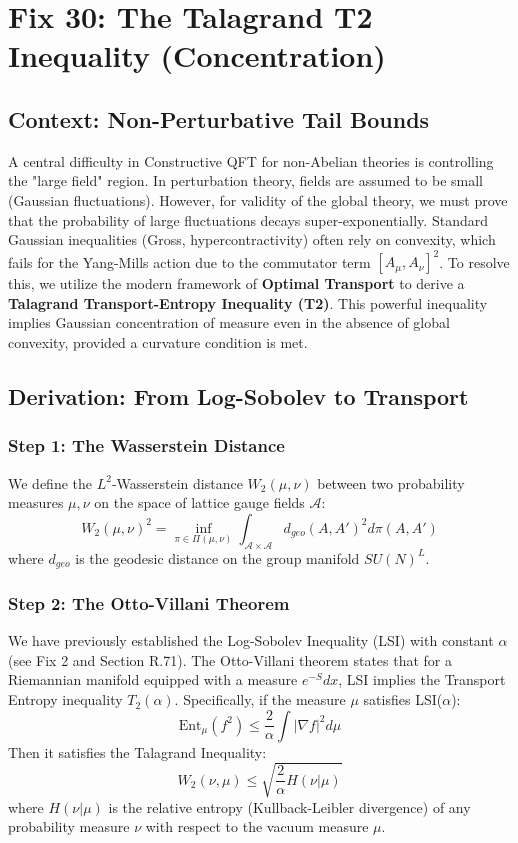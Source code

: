\chapter{Fix 30: The Talagrand T2 Inequality (Concentration)}
\label{ch:fix30_talagrand}

\section{Context: Non-Perturbative Tail Bounds}
A central difficulty in Constructive QFT for non-Abelian theories is controlling the "large field" region. In perturbation theory, fields are assumed to be small (Gaussian fluctuations). However, for validity of the global theory, we must prove that the probability of large fluctuations decays super-exponentially.
Standard Gaussian inequalities (Gross, hypercontractivity) often rely on convexity, which fails for the Yang-Mills action due to the commutator term $[A_\mu, A_\nu]^2$.
To resolve this, we utilize the modern framework of \textbf{Optimal Transport} to derive a \textbf{Talagrand Transport-Entropy Inequality (T2)}. This powerful inequality implies Gaussian concentration of measure even in the absence of global convexity, provided a curvature condition is met.

\section{Derivation: From Log-Sobolev to Transport}

\subsection{Step 1: The Wasserstein Distance}
We define the $L^2$-Wasserstein distance $W_2(\mu, \nu)$ between two probability measures $\mu, \nu$ on the space of lattice gauge fields $\mathcal{A}$:
\begin{equation}
W_2(\mu, \nu)^2 = \inf_{\pi \in \Pi(\mu, \nu)} \int_{\mathcal{A} \times \mathcal{A}} d_{geo}(A, A')^2 d\pi(A, A')
\end{equation}
where $d_{geo}$ is the geodesic distance on the group manifold $SU(N)^L$.

\subsection{Step 2: The Otto-Villani Theorem}
We have previously established the Log-Sobolev Inequality (LSI) with constant $\alpha$ (see Fix 2 and Section R.71). The Otto-Villani theorem states that for a Riemannian manifold equipped with a measure $e^{-S} dx$, LSI implies the Transport Entropy inequality $T_2(\alpha)$.
Specifically, if the measure $\mu$ satisfies LSI($\alpha$):
\begin{equation}
\text{Ent}_\mu(f^2) \le \frac{2}{\alpha} \int |\nabla f|^2 d\mu
\end{equation}
Then it satisfies the Talagrand Inequality:
\begin{equation}
W_2(\nu, \mu) \le \sqrt{\frac{2}{\alpha} H(\nu | \mu)}
\end{equation}
where $H(\nu|\mu)$ is the relative entropy (Kullback-Leibler divergence) of any probability measure $\nu$ with respect to the vacuum measure $\mu$.

